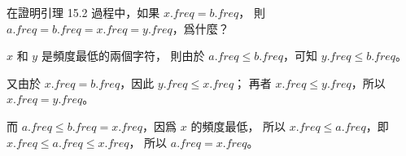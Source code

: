 \startEXERCISE
在證明引理 15.2 過程中，如果 $x.freq = b.freq$，
則 $a.freq = b.freq = x.freq = y.freq$，爲什麼？
\stopEXERCISE

\startANSWER
$x$ 和 $y$ 是頻度最低的兩個字符，
則由於 $a.freq \le b.freq$，可知 $y.freq \le b.freq$。

又由於 $x.freq = b.freq$，因此 $y.freq \le x.freq$；
再者 $x.freq \le y.freq$，所以 $x.freq = y.freq$。

而 $a.freq \le b.freq = x.freq$，因爲 $x$ 的頻度最低，
所以 $x.freq \le a.freq$，即 $x.freq \le a.freq \le x.freq$，
所以 $a.freq = x.freq$。
\stopANSWER
